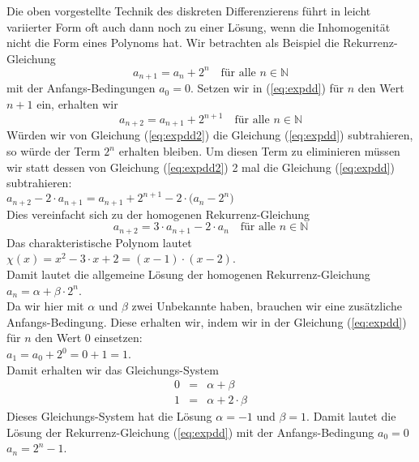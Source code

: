 \noindent
Die oben vorgestellte Technik des diskreten Differenzierens führt in leicht variierter
Form oft auch dann noch zu einer Lösung, wenn die Inhomogenität nicht die Form eines
Polynoms hat.  Wir betrachten als Beispiel die Rekurrenz-Gleichung 
\begin{equation}
  \label{eq:expdd}
  a_{n+1} = a_n + 2^n \quad \mbox{für alle $n \in \mathbb{N}$}
\end{equation}
mit der Anfangs-Bedingungen $a_0 = 0$.   Setzen wir in (\ref{eq:expdd}) für $n$ den Wert $n+1$
ein, erhalten wir 
\begin{equation}
  \label{eq:expdd2}
  a_{n+2} = a_{n+1} + 2^{n+1} \quad \mbox{für alle $n \in \mathbb{N}$}
\end{equation}
Würden wir von Gleichung (\ref{eq:expdd2}) die Gleichung (\ref{eq:expdd}) subtrahieren, so würde
der Term $2^n$ erhalten bleiben.  Um diesen Term zu eliminieren müssen wir statt dessen
von Gleichung (\ref{eq:expdd2}) 2 mal die Gleichung (\ref{eq:expdd})  subtrahieren: \\[0.2cm]
\hspace*{1.3cm}  
$a_{n+2} - 2 \cdot a_{n+1} = a_{n+1} + 2^{n+1} - 2 \cdot \bigl(a_n - 2^n\bigr)$ 
                 \\[0.2cm]
Dies vereinfacht sich zu der homogenen Rekurrenz-Gleichung 
\begin{equation}
  \label{eq:expdd3}
  a_{n+2} = 3 \cdot a_{n+1} - 2 \cdot a_n \quad \mbox{für alle $n \in \mathbb{N}$}  
\end{equation}
Das charakteristische Polynom lautet \\[0.2cm]
\hspace*{1.3cm} 
$\chi(x) = x^2 - 3 \cdot x + 2 = (x-1) \cdot (x-2)$.  \\[0.2cm]
Damit lautet die allgemeine Lösung der homogenen Rekurrenz-Gleichung \\[0.2cm]
\hspace*{1.3cm} 
$a_n = \alpha + \beta \cdot 2^n$.  \\[0.2cm]
Da wir hier mit $\alpha$ und $\beta$ zwei Unbekannte haben, brauchen wir eine zusätzliche
Anfangs-Bedingung.  Diese erhalten wir, indem wir in der Gleichung (\ref{eq:expdd}) für $n$
den Wert $0$ einsetzen: \\[0.2cm]
\hspace*{1.3cm} $a_1 = a_0 + 2^0 = 0 + 1 = 1$. \\[0.2cm]
Damit erhalten wir das Gleichungs-System 
\[ 
\begin{array}{lcl}
0 &=& \alpha  + \beta  \\
1 &=& \alpha  + 2 \cdot \beta
\end{array} 
\]
Dieses Gleichungs-System hat die Lösung $\alpha = -1$ und $\beta = 1$.
Damit lautet die Lösung der Rekurrenz-Gleichung (\ref{eq:expdd}) mit der Anfangs-Bedingung
$a_0 = 0$ \\[0.2cm]
\hspace*{1.3cm} $a_n = 2^n - 1$.


